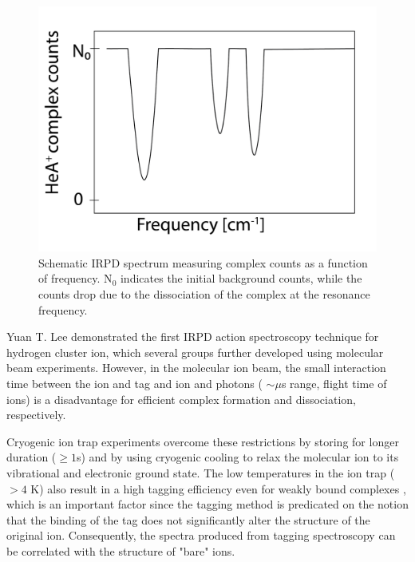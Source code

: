 \begin{figure}[!htb]
    \centering
    \includegraphics[scale=0.5]{figures/intro/IRPD_spectrum.png}
    \caption{Schematic IRPD spectrum measuring complex counts as a function of frequency. N$_0$ indicates the initial background counts, while the counts drop due to the dissociation of the complex at the resonance frequency.}
    \label{fig:IRPD_spectrum}
\end{figure}

Yuan T. Lee demonstrated the first  IRPD action spectroscopy technique  \cite{okumura_vibrational_1985} for hydrogen cluster ion, which several groups further developed \cite{bieske_spectroscopic_1993, duncan_infrared_2003, lisy_infrared_2006} using molecular beam experiments. However, in the molecular ion beam, the small interaction time between the ion and tag and ion and photons ( $\sim \mu$s range, flight time of ions) is a disadvantage for efficient complex formation and dissociation, respectively.

Cryogenic ion trap experiments overcome these restrictions \cite{asmis_mass-selected_2002, kohguchi_high-resolution_2018, jusko_felion_2019, topfer_spectroscopic_2020, dahlmann_predissociation_2022} by storing for longer duration ($\geq 1$s) and by using cryogenic cooling to relax the molecular ion to its vibrational and electronic ground state. The low temperatures in the ion trap ($> 4$ K) also result in a high tagging efficiency even for weakly bound complexes \cite{roithova_helium_2016, gerlich_infrared_2018}, which is an important factor since the tagging method is predicated on the notion that the binding of the tag does not significantly alter the structure of the original ion. Consequently, the spectra produced from tagging spectroscopy can be correlated with the structure of "bare" ions.\\

